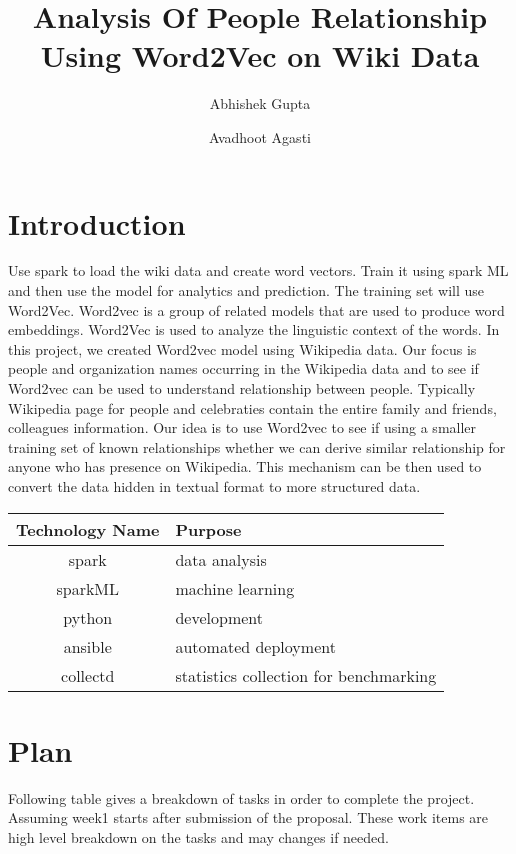 \documentclass[9pt,twocolumn,twoside]{styles/osajnl}
\title{Analysis Of People Relationship Using Word2Vec on Wiki Data}
\author[1,*]{Abhishek Gupta}
\author[1, **]{Avadhoot Agasti}
\affil[1]{School of Informatics and Computing, Bloomington, IN 47408, U.S.A.}
\affil[*]{Corresponding authors: abhigupt@iu.edu}
\affil[**]{Corresponding authors: aagasti@iu.edu}
\begin{document}
\maketitle

\tableofcontents

\section{Introduction}

Use spark \cite{www-spark-python} to load the wiki data and create word vectors. Train it using spark ML  \cite{www-sparkml} and then use the model for analytics and prediction. The training set will use Word2Vec. Word2vec \cite{www-word2vec} is a group of related models that are used to produce word embeddings. Word2Vec is used to analyze the linguistic context of the words. In this project, we created Word2vec model using Wikipedia data. Our focus is people and organization names occurring in the Wikipedia data and to see if Word2vec can be used to understand relationship between people. Typically Wikipedia page for people and celebraties contain the entire family and friends, colleagues information. Our idea is to use Word2vec to see if using a smaller training set of known relationships whether we can derive similar relationship for anyone who has presence on Wikipedia. This mechanism can be then used to convert the data hidden in textual format to more structured data. 

\begin{center}
 \begin{tabular}{||c l||} 
 \hline
 Technology Name & Purpose  \\ [0.5ex] 
 \hline\hline
 spark \cite{www-spark-python} & data analysis  \\
 \hline
 sparkML \cite{www-sparkml} & machine learning  \\
 \hline
 python \cite{www-spark-python} & development \\
 \hline
 ansible \cite{www-ansible} & automated deployment \\
 \hline
 collectd \cite{www-collectd} & statistics collection for benchmarking \\
 \hline
\end{tabular}
\end{center}

\section{Plan}
Following table gives a breakdown of tasks in order to complete the project. Assuming week1 starts after submission of the proposal. These work items are high level breakdown on the tasks and may changes if needed.
\end{document}

